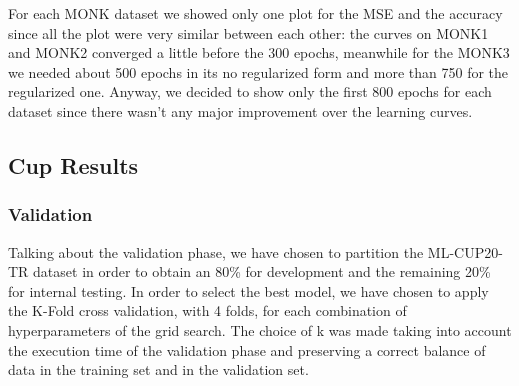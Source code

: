 For each MONK dataset we showed only one plot for the MSE and the accuracy since all the plot were very similar between each other: the curves on MONK1 and MONK2 converged a little before the 300 epochs, meanwhile for the MONK3 we needed about 500 epochs in its no regularized form and more than 750 for the regularized one. Anyway, we decided to show only the first 800 epochs for each dataset since there wasn't any major improvement over the learning curves.
\subsection{Cup Results}
\label{subsec:cupResult}
\subsubsection{Validation}
Talking about the validation phase, we have chosen to partition the ML-CUP20-TR dataset in order to obtain an 80{\%} for development and the remaining 20{\%} for internal testing. In order to select the best model, we have chosen to apply the K-Fold cross validation, with 4 folds, for each combination of hyperparameters of the grid search. The choice of k was made taking into account the execution time of the validation phase and preserving a correct balance of data in the training set and in the validation set.


